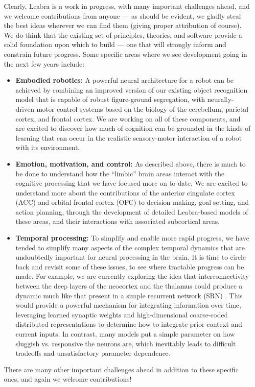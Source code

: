 \documentclass[11pt,twoside]{article}
\begin{document}
Clearly, Leabra is a work in progress, with many important challenges ahead,
and we welcome contributions from anyone --- as should be evident, we gladly
steal the best ideas wherever we can find them (giving proper attribution of
course).  We do think that the existing set of principles, theories, and
software provide a solid foundation upon which to build --- one that will
strongly inform and constrain future progress.  Some specific areas where we see development going in the next few years include:
\begin{itemize}
\item {\bf Embodied robotics:} A powerful neural architecture for a robot can be
  achieved by combining an improved version of our existing object recognition
  model \cite{OReillyEtAlIP} that is capable of robust figure-ground
  segregation, with neurally-driven motor control systems based on the biology
  of the cerebellum, parietal cortex, and frontal cortex.  We are working on
  all of these components, and are excited to discover how much of cognition
  can be grounded in the kinds of learning that can occur in the realistic
  sensory-motor interaction of a robot with its environment.

\item {\bf Emotion, motivation, and control:} As described above, there is
  much to be done to understand how the ``limbic'' brain areas interact with
  the cognitive processing that we have focused more on to date.  We are
  excited to understand more about the contributions of the anterior cingulate
  cortex (ACC) and orbital frontal cortex (OFC) to decision making, goal
  setting, and action planning, through the development of detailed
  Leabra-based models of these areas, and their interactions with associated
  subcortical areas.

\item {\bf Temporal processing:} To simplify and enable more rapid progress,
  we have tended to simplify many aspects of the complex temporal dynamics
  that are undoubtedly important for neural processing in the brain.  It is
  time to circle back and revisit some of these issues, to see where tractable
  progress can be made.  For example, we are currently exploring the idea that
  interconnectivity between the deep layers of the neocortex and the thalamus
  could produce a dynamic much like that present in a simple recurrent network
  (SRN) \cite{Elman90}.  This would provide a powerful mechanism for
  integrating information over time, leveraging learned synaptic weights and
  high-dimensional coarse-coded distributed representations to determine how
  to integrate prior context and current inputs.  In contrast, many models put
  a simple parameter on how sluggish vs. responsive the neurons are, which
  inevitably leads to difficult tradeoffs and unsatisfactory parameter
  dependence.
\end{itemize}

There are many other important challenges ahead in addition to these specific ones, and again we welcome contributions!

\clearpage


\end{document}
